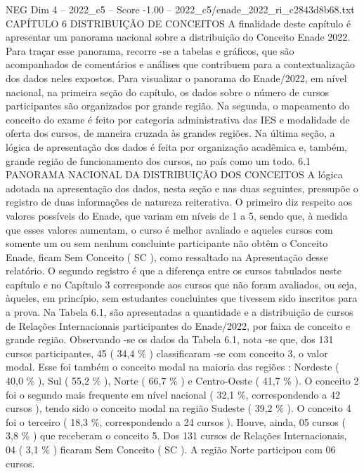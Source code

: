 \begin{textsample}{NEG Dim 4 – 2022\_c5 – Score -1.00 – 2022\_c5/enade\_2022\_ri\_c2843d8b68.txt}  \label{ex:f4_neg_073}
CAPÍTULO 6 DISTRIBUIÇÃO DE CONCEITOS A finalidade deste capítulo é apresentar um panorama nacional sobre a distribuição do Conceito Enade 2022.
Para traçar esse panorama, recorre -se a tabelas e gráficos, que são acompanhados de comentários e análises que contribuem para a contextualização dos dados neles expostos.
Para visualizar o panorama do Enade/2022, em nível nacional, na primeira seção do capítulo, os dados sobre o número de cursos participantes são organizados por grande região.
Na segunda, o mapeamento do conceito do exame é feito por categoria administrativa das IES e modalidade de oferta dos cursos, de maneira cruzada às grandes regiões.
Na última seção, a lógica de apresentação dos dados é feita por organização acadêmica e, também, grande região de funcionamento dos cursos, no país como um todo. 6.1 PANORAMA NACIONAL DA DISTRIBUIÇÃO DOS CONCEITOS A lógica adotada na apresentação dos dados, nesta seção e nas duas seguintes, pressupõe o registro de duas informações de natureza reiterativa.
O primeiro diz respeito aos valores possíveis do Enade, que variam em níveis de 1 a 5, sendo que, à medida que esses valores aumentam, o curso é melhor avaliado e aqueles cursos com somente um ou sem nenhum concluinte participante não obtêm o Conceito Enade, ficam Sem Conceito ( SC ), como ressaltado na Apresentação desse relatório.
O segundo registro é que a diferença entre os cursos tabulados neste capítulo e no Capítulo 3 corresponde aos cursos que não foram avaliados, ou seja, àqueles, em princípio, sem estudantes concluintes que tivessem sido inscritos para a prova.
Na Tabela 6.1, são apresentadas a quantidade e a distribuição de cursos de Relações Internacionais participantes do Enade/2022, por faixa de conceito e grande região.
Observando -se os dados da Tabela 6.1, nota -se que, dos 131 cursos participantes, 45 ( 34,4 \% ) classificaram -se com conceito 3, o valor modal.
Esse foi também o conceito modal na maioria das regiões : Nordeste ( 40,0 \% ), Sul ( 55,2 \% ), Norte ( 66,7 \% ) e Centro-Oeste ( 41,7 \% ).
O conceito 2 foi o segundo mais frequente em nível nacional ( 32,1 \%, correspondendo a 42 cursos ), tendo sido o conceito modal na região Sudeste ( 39,2 \% ).
O conceito 4 foi o terceiro ( 18,3 \%, correspondendo a 24 cursos ).
Houve, ainda, 05 cursos ( 3,8 \% ) que receberam o conceito 5.
Dos 131 cursos de Relações Internacionais, 04 ( 3,1 \% ) ficaram Sem Conceito ( SC ).
A região Norte participou com 06 cursos.

\end{textsample}
